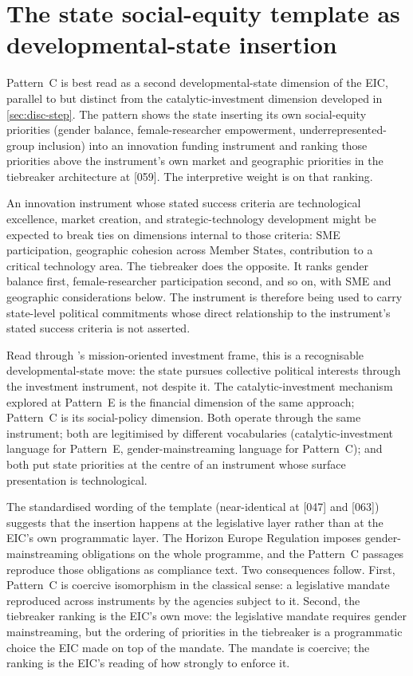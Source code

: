\section{The state social-equity template as developmental-state
insertion}
\label{sec:disc-equity}

Pattern~C is best read as a second developmental-state dimension of
the EIC, parallel to but distinct from the catalytic-investment
dimension developed in \cref{sec:disc-step}. The pattern shows the
state inserting its own social-equity priorities (gender balance,
female-researcher empowerment, underrepresented-group inclusion) into
an innovation funding instrument and ranking those priorities above
the instrument's own market and geographic priorities in the
tiebreaker architecture at [059]. The interpretive weight is on that
ranking.

An innovation instrument whose stated success criteria are
technological excellence, market creation, and strategic-technology
development might be expected to break ties on dimensions internal to
those criteria: SME participation, geographic cohesion across Member
States, contribution to a critical technology area. The tiebreaker
does the opposite. It ranks gender balance first, female-researcher
participation second, and so on, with SME and geographic
considerations below. The instrument is therefore being used to carry
state-level political commitments whose direct relationship to the
instrument's stated success criteria is not asserted.

Read through \textcite{mazzucato2013entrepreneurial}'s mission-oriented
investment frame, this is a recognisable developmental-state move: the
state pursues collective political interests through the investment
instrument, not despite it. The catalytic-investment mechanism
explored at Pattern~E is the financial dimension of the same approach;
Pattern~C is its social-policy dimension. Both operate through the
same instrument; both are legitimised by different vocabularies
(catalytic-investment language for Pattern~E, gender-mainstreaming
language for Pattern~C); and both put state priorities at the centre
of an instrument whose surface presentation is technological.

The standardised wording of the template (near-identical at [047] and
[063]) suggests that the insertion happens at the legislative layer
rather than at the EIC's own programmatic layer. The Horizon Europe
Regulation imposes gender-mainstreaming obligations on the whole
programme, and the Pattern~C passages reproduce those obligations as
compliance text. Two consequences follow. First, Pattern~C is coercive
isomorphism in the classical \textcite{dimaggio1983iron} sense: a
legislative mandate reproduced across instruments by the agencies
subject to it. Second, the tiebreaker ranking is the EIC's own move:
the legislative mandate requires gender mainstreaming, but the
ordering of priorities in the tiebreaker is a programmatic choice the
EIC made on top of the mandate. The mandate is coercive; the ranking
is the EIC's reading of how strongly to enforce it.

